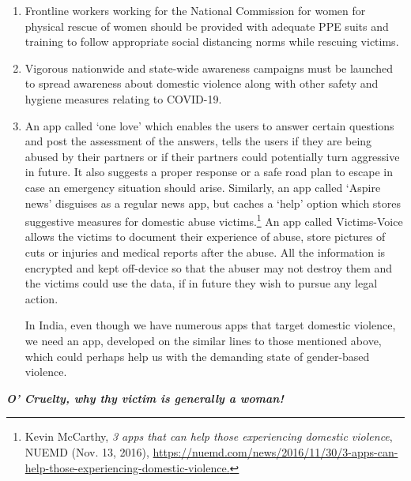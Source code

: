 \begin{multicols}{2}
\begin{enumerate}
\item Frontline workers working for the National Commission for women for physical
rescue of women should be provided with adequate PPE suits and training to follow
appropriate social distancing norms while rescuing victims.

\item Vigorous nationwide and state-wide awareness campaigns must be launched to spread
awareness about domestic violence along with other safety and hygiene measures
relating to COVID-19. 

\item An app called ‘one love’ which enables the users to answer certain questions and post
the assessment of the answers, tells the users if they are being abused by their partners
or if their partners could potentially turn aggressive in future. It also suggests a proper
response or a safe road plan to escape in case an emergency situation should arise.
Similarly, an app called ‘Aspire news’ disguises as a regular news app, but caches a
‘help’ option which stores suggestive measures for domestic abuse victims.\footnote{Kevin McCarthy, \textit{3 apps that can help those experiencing domestic violence}, NUEMD (Nov. 13, 2016),
\url{https://nuemd.com/news/2016/11/30/3-apps-can-help-those-experiencing-domestic-violence.}} An app
called Victims-Voice allows the victims to document their experience of abuse, store
pictures of cuts or injuries and medical reports after the abuse. All the information is
encrypted and kept off-device so that the abuser may not destroy them and the victims
could use the data, if in future they wish to pursue any legal action.

In India, even though we have numerous apps that target domestic violence, we need
an app, developed on the similar lines to those mentioned above, which could perhaps
help us with the demanding state of gender-based violence.

\end{enumerate}


\noi
{\large\it\bfseries O’ Cruelty, why thy victim is generally a woman!}


\end{multicols}
